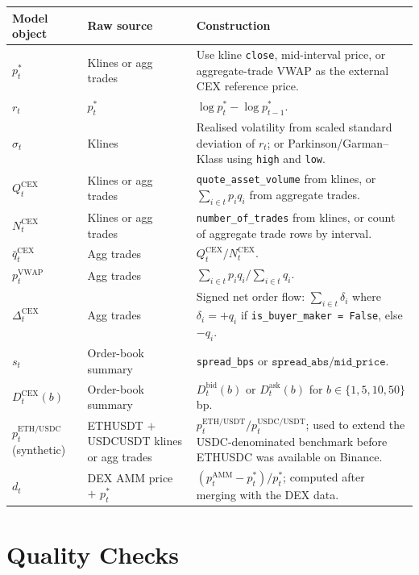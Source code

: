 \documentclass[11pt,a4paper]{article}
\begin{document}
\begin{xltabular}{\linewidth}{L{3.0cm}L{3.8cm}Y}
\toprule
\textbf{Model object} & \textbf{Raw source} & \textbf{Construction} \\
\midrule
$p_t^{*}$ &
  Klines or agg trades &
  Use kline \texttt{close}, mid-interval price, or aggregate-trade
  VWAP as the external CEX reference price. \\
$r_t$ &
  $p_t^{*}$ &
  $\log p_t^{*} - \log p_{t-1}^{*}$. \\
$\sigma_t$ &
  Klines &
  Realised volatility from scaled standard deviation of
  $r_t$; or Parkinson/Garman--Klass using \texttt{high} and
  \texttt{low}. \\
$Q_t^{\mathrm{CEX}}$ &
  Klines or agg trades &
  \texttt{quote\_asset\_volume} from klines, or
  $\sum_{i \in t} p_i q_i$ from aggregate trades. \\
$N_t^{\mathrm{CEX}}$ &
  Klines or agg trades &
  \texttt{number\_of\_trades} from klines, or count of aggregate
  trade rows by interval. \\
$\bar{q}_t^{\mathrm{CEX}}$ &
  Agg trades &
  $Q_t^{\mathrm{CEX}} / N_t^{\mathrm{CEX}}$. \\
$p_t^{\mathrm{VWAP}}$ &
  Agg trades &
  $\sum_{i \in t} p_i q_i / \sum_{i \in t} q_i$. \\
$\Delta_t^{\mathrm{CEX}}$ &
  Agg trades &
  Signed net order flow: $\sum_{i \in t} \delta_i$ where
  $\delta_i = +q_i$ if \texttt{is\_buyer\_maker = False},
  else $-q_i$. \\
$s_t$ &
  Order-book summary &
  \texttt{spread\_bps} or
  $\texttt{spread\_abs} / \texttt{mid\_price}$. \\
$D_t^{\mathrm{CEX}}(b)$ &
  Order-book summary &
  $D_t^{\mathrm{bid}}(b)$ or $D_t^{\mathrm{ask}}(b)$ for
  $b \in \{1, 5, 10, 50\}$ bp. \\
$p_t^{\mathrm{ETH/USDC}}$ (synthetic) &
  ETHUSDT $+$ USDCUSDT klines or agg trades &
  $p_t^{\mathrm{ETH/USDT}} / p_t^{\mathrm{USDC/USDT}}$;
  used to extend the USDC-denominated benchmark before ETHUSDC
  was available on Binance. \\
$d_t$ &
  DEX AMM price $+$ $p_t^{*}$ &
  $(p_t^{\mathrm{AMM}} - p_t^{*}) / p_t^{*}$; computed after
  merging with the DEX data. \\
\bottomrule
\end{xltabular}

\section{Quality Checks}
\label{sec:qc}
\end{document}
